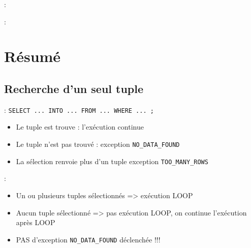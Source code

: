 \documentclass[10pt]{beamer}
\begin{document}
\begin{frame}[allowframebreaks]{\secname : \subsecname}
    
\end{frame}

\begin{frame}[allowframebreaks]{\secname : \subsecname}
    
\end{frame}

\section{Résumé}
\tocss
\subsection{Recherche d'un seul tuple}
\begin{frame}{\secname : \subsecname}
    \lstinline[language=plsql]!SELECT ... INTO ... FROM ... WHERE ... ;!
    \begin{itemize}
        \item Le tuple est trouve : l'exécution continue
        \item Le tuple n'est pas trouvé :
              exception \lstinline[language=plsql]!NO_DATA_FOUND!
        \item La sélection renvoie plus d'un tuple
              exception \lstinline[language=plsql]!TOO_MANY_ROWS!
    \end{itemize}
\end{frame}

\begin{frame}{\secname : \subsecname}
    
    \begin{itemize}
        \item Un ou plusieurs tuples sélectionnés => exécution LOOP
        \item Aucun tuple sélectionné => pas exécution LOOP, on continue l'exécution après LOOP
        \item PAS d'exception \lstinline[language=plsql]!NO_DATA_FOUND! déclenchée !!!
    \end{itemize}
\end{frame}
\end{document}
